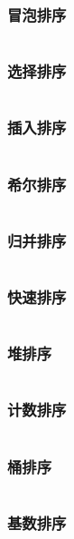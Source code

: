 \documentclass[a4paper,11pt]{article}
\begin{document}
\subsubsection{冒泡排序}
\inputminted[linenos,autogobble]{java}{basic/sort/bubble.java}

\subsubsection{选择排序}
\inputminted[linenos,autogobble]{java}{basic/sort/select.java}

\subsubsection{插入排序} 
\inputminted[linenos,autogobble]{java}{basic/sort/insert.java}

\subsubsection{希尔排序} 
\inputminted[linenos,autogobble]{java}{basic/sort/shell.java}

\subsubsection{归并排序} 
\inputminted[linenos,autogobble]{java}{basic/sort/merge.java}

\subsubsection{快速排序} 
\inputminted[linenos,autogobble]{java}{basic/sort/quick.java}

\subsubsection{堆排序} 
\inputminted[linenos,autogobble]{java}{basic/sort/heap.java}

\subsubsection{计数排序} 
\inputminted[linenos,autogobble]{java}{basic/sort/count.java}

\subsubsection{桶排序} 
\inputminted[linenos,autogobble]{java}{basic/sort/bucket.java}

\subsubsection{基数排序} 
\inputminted[linenos,autogobble]{java}{basic/sort/redix.java}
\end{document}
